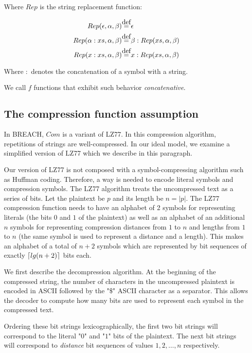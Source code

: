 \documentclass{article}
\DeclarePairedDelimiter{\ceil}{\lceil}{\rceil}
\newcommand\defeq{\stackrel{\mathclap{\normalfont\mbox{def}}}{=}}
\begin{document}
Where $Rep$ is the string replacement function:

\begin{align*}
Rep(\epsilon, \alpha, \beta) &\defeq \epsilon\\
Rep(\alpha:xs, \alpha, \beta) &\defeq \beta:Rep(xs, \alpha, \beta)\\
Rep(x:xs, \alpha, \beta) &\defeq x:Rep(xs, \alpha, \beta)
\end{align*}

Where $:$ denotes the concatenation of a symbol with a string.

We call $f$ functions that exhibit such behavior \textit{concatenative}.

\subsection{The compression function assumption}

In BREACH, $Com$ is a variant of LZ77. In this compression algorithm, repetitions
of strings are well-compressed. In our ideal model, we examine a simplified version
of LZ77 which we describe in this paragraph.

Our version of LZ77 is not composed with a symbol-compressing algorithm such as
Huffman coding. Therefore, a way is needed to encode literal symbols and compression
symbols. The LZ77 algorithm treats the uncompressed text as a series of bits. Let the
plaintext be $p$ and its length be $n = |p|$. The LZ77 compression function needs
to have an alphabet of 2 symbols for representing literals (the bits $0$ and $1$ of
the plaintext) as well as an alphabet of an additional $n$ symbols for representing compression distances from $1$ to $n$ and lengths from $1$ to $n$ (the same symbol is
used to represent a distance and a length). This makes an alphabet of a total of
$n + 2$ symbols which are represented by bit sequences of exactly $\ceil{lg(n + 2)}$
bits each.

We first describe the decompression algorithm. At the beginning of the compressed
string, the number
of characters in the uncompressed plaintext is encoded in ASCII followed by the "$\$$"
ASCII character as a separator. This allows the decoder to compute how many bits are used to
represent each symbol in the compressed text.

Ordering these bit strings lexicographically, the first two bit strings will correspond to the literal
"$0$" and "$1$" bits of the plaintext. The next bit strings will correspond to \textit{distance} bit sequences of
values $1, 2, \ldots, n$ respectively.
\end{document}
